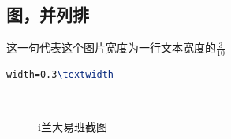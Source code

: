 \documentclass{LZUThesis}
\begin{document}
\subsection{图，并列排} %
\label{sub:图_并列排}

这一句代表这个图片宽度为一行文本宽度的$\frac{3}{10}$
\begin{lstlisting}[language = tex]
width=0.3\textwidth
\end{lstlisting}



\begin{figure}[H]
	\centering
	\\	
    \caption{i兰大易班截图}
    \label{fig_ldr}
\end{figure}
\end{document}
